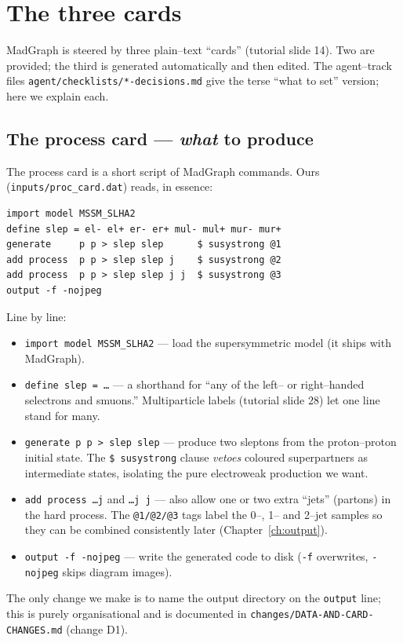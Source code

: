 \documentclass[11pt,oneside]{report}
\newcommand{\code}[1]{\texttt{#1}}
\begin{document}
\chapter{The three cards}
\label{ch:cards}

MadGraph is steered by three plain--text ``cards'' (tutorial slide 14). Two are provided; the third
is generated automatically and then edited. The agent--track files
\code{agent/checklists/*-decisions.md} give the terse ``what to set'' version; here we explain each.

\section{The process card --- \emph{what} to produce}
The process card is a short script of MadGraph commands. Ours (\code{inputs/proc\_card.dat}) reads,
in essence:
\begin{lstlisting}[style=card]
import model MSSM_SLHA2
define slep = el- el+ er- er+ mul- mul+ mur- mur+
generate     p p > slep slep      $ susystrong @1
add process  p p > slep slep j    $ susystrong @2
add process  p p > slep slep j j  $ susystrong @3
output -f -nojpeg
\end{lstlisting}
Line by line:
\begin{itemize}[nosep]
  \item \code{import model MSSM\_SLHA2} --- load the supersymmetric model (it ships with MadGraph).
  \item \code{define slep = \dots} --- a shorthand for ``any of the left-- or right--handed
        selectrons and smuons.'' Multiparticle labels (tutorial slide 28) let one line stand for many.
  \item \code{generate p p > slep slep} --- produce two sleptons from the proton--proton initial
        state. The \code{\$ susystrong} clause \emph{vetoes} coloured superpartners as
        intermediate states, isolating the pure electroweak production we want.
  \item \code{add process \dots j} and \code{\dots j j} --- also allow one or two extra
        ``jets'' (partons) in the hard process. The \code{@1/@2/@3} tags label the 0--, 1-- and
        2--jet samples so they can be combined consistently later (Chapter~\ref{ch:output}).
  \item \code{output -f -nojpeg} --- write the generated code to disk (\code{-f} overwrites,
        \code{-nojpeg} skips diagram images).
\end{itemize}
The only change we make is to name the output directory on the \code{output} line; this is purely
organisational and is documented in \code{changes/DATA-AND-CARD-CHANGES.md} (change D1).
\end{document}

